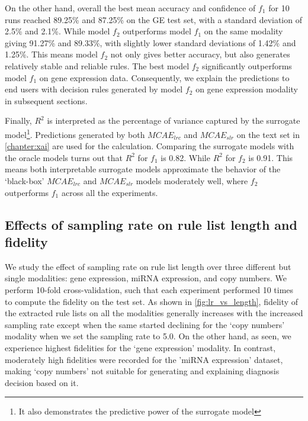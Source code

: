 \hspace*{3.5mm} On the other hand, overall the best mean accuracy and confidence of $f_1$ for 10 runs reached 89.25\% and 87.25\% on the GE test set, with a standard deviation of 2.5\% and 2.1\%. While model $f_2$ outperforms model $f_1$ on the same modality giving 91.27\% and 89.33\%, with slightly lower standard deviations of 1.42\% and 1.25\%. This means model $f_2$ not only gives better accuracy, but also generates relatively stable and reliable rules. The best model $f_2$ significantly outperforms model $f_1$ on gene expression data. Consequently, we explain the predictions to end users with decision rules generated by model $f_2$ on gene expression modality in subsequent sections. 

\hspace*{3.5mm} Finally, $R^2$ is interpreted as the percentage of variance captured by the surrogate model\footnote{It also demonstrates the predictive power of the surrogate model}. Predictions generated by both $MCAE_{lrc}$ and $MCAE_{slr}$ on the text set in \cref{chapter:xai} are used for the calculation. Comparing the surrogate models with the oracle models turns out that $R^2$ for $f_1$ is 0.82. While $R^2$ for $f_2$ is 0.91. This means both interpretable surrogate models approximate the behavior of the `black-box' $MCAE_{lrc}$ and $MCAE_{slr}$ models moderately well, where $f_2$ outperforms $f_1$ across all the experiments. 

\subsection{Effects of sampling rate on rule list length and fidelity}
We study the effect of sampling rate on rule list length over three different but single modalities: gene expression, miRNA expression, and copy numbers. We perform 10-fold cross-validation, such that each experiment performed 10 times to compute the fidelity on the test set. As shown in \cref{fig:lr_vs_length}, fidelity of the extracted rule lists on all the modalities generally increases with the increased sampling rate except when the same started declining for the `copy numbers' modality when we set the sampling rate to 5.0. On the other hand, as seen, we experience highest fidelities for the `gene expression' modality. In contrast, moderately high fidelities were recorded for the 'miRNA expression' dataset, making `copy numbers' not suitable for generating and explaining diagnosis decision based on it. 

